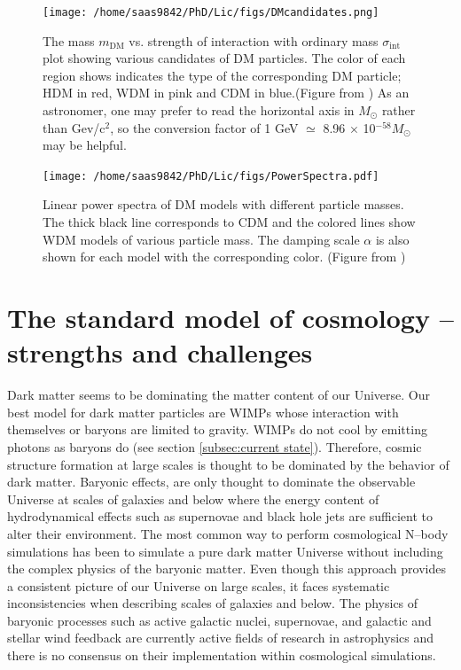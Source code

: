 \documentclass[a4wide,12pt]{book}
\begin{document}
\begin{figure}
\centering
\texttt{[image: /home/saas9842/PhD/Lic/figs/DMcandidates.png]} %
\caption{The mass $m_\mathrm{DM}$ vs. strength of interaction with ordinary mass $\sigma_\mathrm{int}$ plot showing various candidates of DM particles. The color of each region shows indicates the type of the corresponding DM particle; HDM in red, WDM in pink and CDM in blue.(Figure from \citealt[][]{Baer+2015}) As an astronomer, one may prefer to read the horizontal axis in $M_\odot$ rather than Gev/c$^2$, so the conversion factor of 1 GeV $\simeq$ 8.96 $\times$ 10$^{-58} M_\odot$ may be helpful.}
\label{fig:DMcandidates}
\end{figure}

\begin{figure}
\centering
\texttt{[image: /home/saas9842/PhD/Lic/figs/PowerSpectra.pdf]} %
\caption{Linear power spectra of DM models with different particle masses. The thick black line corresponds to CDM and the colored lines show WDM models of various particle mass. The damping scale $\alpha$ is also shown for each model with the corresponding color. (Figure from \citealt[][]{Kennedy+2014})}
\label{fig:CDM_WDM_PS}
\end{figure}


\chapter{The standard model of cosmology -- strengths and challenges}
\label{sec:LCDM}
Dark matter seems to be dominating the matter content of our Universe. Our best model for dark matter particles are WIMPs whose interaction with themselves or baryons are limited to gravity.  WIMPs do not cool by emitting photons as baryons do (see section \ref{subsec:current state}). Therefore, cosmic structure formation at large scales is thought to be dominated by the behavior of dark matter. Baryonic effects, are only thought to dominate the observable Universe at scales of galaxies and below where the energy content of hydrodynamical effects such as supernovae and black hole jets are sufficient to alter their environment. The most common way to perform cosmological N--body simulations has been to simulate a pure dark matter Universe without including the complex physics of the baryonic matter.  Even though this approach provides a consistent picture of our Universe on large scales, it faces systematic inconsistencies when describing scales of galaxies and below. The physics of baryonic processes such as active galactic nuclei, supernovae, and galactic and stellar wind feedback are currently active fields of research in astrophysics and there is no consensus on their implementation within cosmological simulations. 
\end{document}
